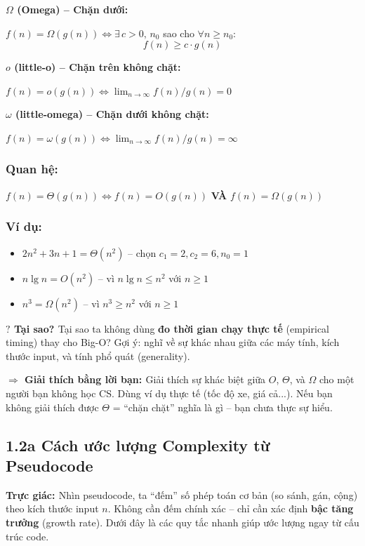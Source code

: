 \documentclass[10pt]{article}
\newcommand{\intuition}[1]{%
  \begin{tcolorbox}[colback=blue!5!white, colframe=blue!60!white, leftrule=3pt,
    toprule=0pt, bottomrule=0pt, rightrule=0pt,
    boxsep=2pt, left=6pt, right=6pt, top=4pt, bottom=4pt]
  \small\textbf{\textcolor{blue!80!black}{Trực giác: }}#1
  \end{tcolorbox}}
\newcommand{\whyprompt}[1]{%
  \begin{tcolorbox}[colback=yellow!8!white, colframe=orange!70!yellow, leftrule=3pt,
    toprule=0pt, bottomrule=0pt, rightrule=0pt,
    boxsep=2pt, left=6pt, right=6pt, top=4pt, bottom=4pt]
  {\small\textbf{\textcolor{orange!80!black}{$\boldsymbol{?}$ Tại sao? }} #1}
  \end{tcolorbox}}
\newcommand{\feynman}[1]{%
  \begin{tcolorbox}[colback=violet!5!white, colframe=violet!60!white, leftrule=3pt,
    toprule=0pt, bottomrule=0pt, rightrule=0pt,
    boxsep=2pt, left=6pt, right=6pt, top=4pt, bottom=4pt]
  {\small\textbf{\textcolor{violet!80!black}{$\Rightarrow$ Giải thích bằng lời bạn: }} #1}
  \end{tcolorbox}}
\providecommand{\tightlist}{\setlength{\itemsep}{0pt}\setlength{\parskip}{0pt}}
\begin{document}
\textbf{\(\Omega\) (Omega) -- Chặn dưới:}

\(f(n) = \Omega(g(n)) \Leftrightarrow \exists\, c > 0,\, n_0\) sao cho
\(\forall n \geq n_0\): \[f(n) \geq c \cdot g(n)\]

\textbf{\(o\) (little-o) -- Chặn trên không chặt:}

\(f(n) = o(g(n)) \Leftrightarrow \lim_{n \to \infty} f(n)/g(n) = 0\)

\textbf{\(\omega\) (little-omega) -- Chặn dưới không chặt:}

\(f(n) = \omega(g(n)) \Leftrightarrow \lim_{n \to \infty} f(n)/g(n) = \infty\)

\subsubsection{Quan hệ:}\label{quan-hux1ec7}

\(f(n) = \Theta(g(n)) \Leftrightarrow f(n) = O(g(n))\) \textbf{VÀ}
\(f(n) = \Omega(g(n))\)

\subsubsection{Ví dụ:}\label{vuxed-dux1ee5}

\begin{itemize}
\tightlist
\item
  \(2n^2 + 3n + 1 = \Theta(n^2)\) -- chọn \(c_1=2, c_2=6, n_0=1\)
\item
  \(n \lg n = O(n^2)\) -- vì \(n \lg n \leq n^2\) với \(n \geq 1\)
\item
  \(n^3 = \Omega(n^2)\) -- vì \(n^3 \geq n^2\) với \(n \geq 1\)
\end{itemize}

\whyprompt{Tại sao ta không dùng \textbf{đo thời gian chạy thực tế} (empirical timing) thay cho Big-O? Gợi ý: nghĩ về sự khác nhau giữa các máy tính, kích thước input, và tính phổ quát (generality).}

\feynman{Giải thích sự khác biệt giữa $O$, $\Theta$, và $\Omega$ cho một người bạn không học CS. Dùng ví dụ thực tế (tốc độ xe, giá cả...). Nếu bạn không giải thích được $\Theta$ = ``chặn chặt'' nghĩa là gì -- bạn chưa thực sự hiểu.}

\subsection{1.2a Cách ước lượng Complexity từ Pseudocode}\label{cach-uoc-luong}

\intuition{Nhìn pseudocode, ta ``đếm'' số phép toán cơ bản (so sánh, gán, cộng) theo kích thước input $n$. Không cần đếm chính xác -- chỉ cần xác định \textbf{bậc tăng trưởng} (growth rate). Dưới đây là các quy tắc nhanh giúp ước lượng ngay từ cấu trúc code.}
\end{document}
